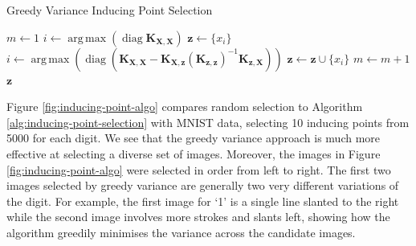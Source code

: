 \documentclass{article}
\newcommand{\diag}{\operatorname{diag}}
\DeclareMathOperator*{\argmax}{arg\,max}
\numberwithin{equation}{section}
\begin{document}
\begin{algorithm}
\caption{Greedy Variance Inducing Point Selection}\label{alg:inducing-point-selection}
\begin{algorithmic}
\State $m \leftarrow 1$
 \State $i \leftarrow \argmax \left(\diag\mathbf{K}_{\mathbf{X}, \mathbf{X}}\right) $
 \State $\mathbf{z} \leftarrow \{x_i\}$ 
\State$i \leftarrow \argmax \left(\diag \left(\mathbf{K}_{\mathbf{X}, \mathbf{X}} - \mathbf{K}_{\mathbf{X}, \mathbf{z}} \left(\mathbf{K}_{\mathbf{z}, \mathbf{z}}\right)^{-1}\mathbf{K}_{\mathbf{z}, \mathbf{X}}\right)\right)$
 \State  $\mathbf{z} \leftarrow \mathbf{z} \cup \{x_i\}$ 
 \State  $m \leftarrow m+1$
\EndWhile
\State \Return $\mathbf{z}$
\end{algorithmic}
\end{algorithm}

Figure \ref{fig:inducing-point-algo} compares random selection to Algorithm \ref{alg:inducing-point-selection} with MNIST data, selecting 10 inducing points from 5000 for each digit. 
We see that the greedy variance approach is much more effective at selecting a diverse set of images.
Moreover, the images in Figure \ref{fig:inducing-point-algo} were selected in order from left to right.
The first two images selected by greedy variance are generally two very different variations of the digit.
For example, the first image for `1' is a single line slanted to the right while the second image involves more strokes and slants left, showing how the algorithm greedily minimises the variance across the candidate images.
\end{document}

